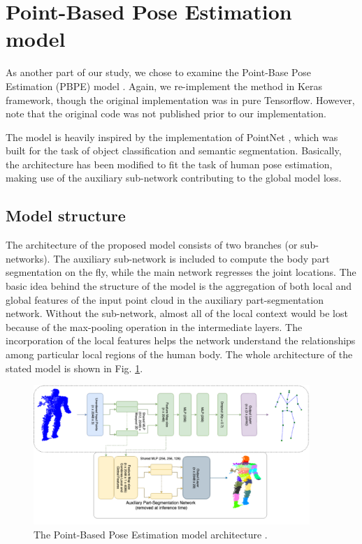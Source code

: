 \section{Point-Based Pose Estimation model}

As another part of our study, we chose to examine the Point-Base Pose Estimation (PBPE) model \cite{Ali19}. Again, we re-implement the method in Keras framework, though the original implementation was in pure Tensorflow. However, note that the original code was not published prior to our implementation.\par
\vspace{5mm}
\noindent %
The model is heavily inspired by the implementation of PointNet \cite{DBLP:journals/corr/QiSMG16}, which was built for the task of object classification and semantic segmentation. Basically, the architecture has been modified to fit the task of human pose estimation, making use of the auxiliary sub-network contributing to the global model loss.


\subsection{Model structure}
The architecture of the proposed model consists of two branches (or sub-networks). The auxiliary sub-network is included to compute the body part segmentation on the fly, while the main network regresses the joint locations. The basic idea behind the structure of the model is the aggregation of both local and global features of the input point cloud in the auxiliary part-segmentation network. Without the sub-network, almost all of the local context would be lost because of the max-pooling operation in the intermediate layers. The incorporation of the local features helps the network understand the relationships among particular local regions of the human body. The whole architecture of the stated model is shown in Fig. \ref{fig:PBPE}.\par
\vspace{5mm}

\begin{figure}[H]
\begin{center}
  \includegraphics[height=200px]{images/implementation/pbpe2.PNG}
  \caption{The Point-Based Pose Estimation model architecture \cite{Ali19}.}
  \label{fig:PBPE}
\end{center}
\end{figure}

